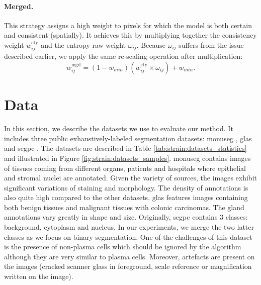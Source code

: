 \paragraph{Merged.} This strategy assigns a high weight to pixels for which the model is both certain and consistent (spatially). It achieves this by multiplying together the consistency weight $w^{\text{cty}}_{ij}$ and the entropy raw weight $\omega_{ij}$. Because $\omega_{ij}$ suffers from the issue described earlier, we apply the same re-scaling operation after multiplication:
\begin{equation}
w^{\text{mgd}}_{ij} = (1 - w_{min}) \left(w^{\text{cty}}_{ij} \times \omega_{ij}\right) + w_{min}.
\end{equation}

\section{Data}
\label{sec:strain:data}

In this section, we describe the datasets we use to evaluate our method. It includes three public exhaustively-labeled segmentation datasets: \acrshort{monuseg} \cite{kumar2019multi}, \acrshort{glas} \cite{sirinukunwattana2017gland} and \acrshort{segpc} \cite{gupta2021segpc}. The datasets are described in Table \ref{tab:strain:datasets_statistics} and illustrated in Figure \ref{fig:strain:datasets_samples}. \acrshort{monuseg} contains images of tissues coming from different organs, patients and hospitals where epithelial and stromal nuclei are annotated. Given the variety of sources, the images exhibit significant variations of staining and morphology. The density of annotations is also quite high compared to the other datasets. \acrshort{glas} features images containing both benign tissues and malignant tissues with colonic carcinomas. The gland annotations vary greatly in shape and size. Originally, \acrshort{segpc} contains 3 classes: background, cytoplasm and nucleus. In our experiments, we merge the two latter classes as we focus on binary segmentation. One of the challenges of this dataset is the presence of non-plasma cells which should be ignored by the algorithm although they are very similar to plasma cells. Moreover, artefacts are present on the images (\eg cracked scanner glass in foreground, scale reference or magnification written on the image).

